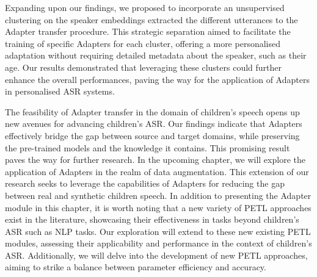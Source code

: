 Expanding upon our findings, we proposed to incorporate an unsupervised clustering on the speaker embeddings extracted the different utterances to the Adapter transfer procedure. This strategic separation aimed to facilitate the training of specific Adapters for each cluster, offering a more personalised adaptation without requiring detailed metadata about the speaker, such as their age. Our results demonstrated that leveraging these clusters could further enhance the overall performances, paving the way for the application of Adapters in personalised \ac{ASR} systems.

The feasibility of Adapter transfer in the domain of children's speech opens up new avenues for advancing children's \ac{ASR}. Our findings indicate that Adapters effectively bridge the gap between source and target domains, while preserving the pre-trained models and the knowledge it contains. This promising result paves the way for further research. In the upcoming chapter, we will explore the application of Adapters in the realm of  data augmentation. This extension of our research seeks to leverage the capabilities of Adapters for reducing the gap between real and synthetic children speech.
In addition to presenting the Adapter module in this chapter, it is worth noting that a new variety of \ac{PETL} approaches exist in the literature, showcasing their effectiveness in tasks beyond children's \ac{ASR} such as \ac{NLP} tasks. Our exploration will extend to these new existing \ac{PETL} modules, assessing their applicability and performance in the context of children's \ac{ASR}. Additionally, we will delve into the development of new \ac{PETL} approaches, aiming to strike a balance between parameter efficiency and accuracy. 


